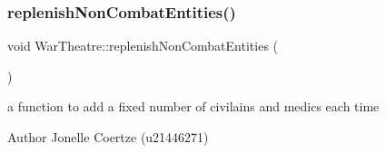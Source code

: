 \subsubsection{\texorpdfstring{replenishNonCombatEntities()}{replenishNonCombatEntities()}}
{\footnotesize\ttfamily void War\+Theatre\+::replenish\+Non\+Combat\+Entities (\begin{DoxyParamCaption}{ }\end{DoxyParamCaption})}



a function to add a fixed number of civilains and medics each time 

\begin{DoxyAuthor}{Author}
Jonelle Coertze (u21446271) 
\end{DoxyAuthor}
